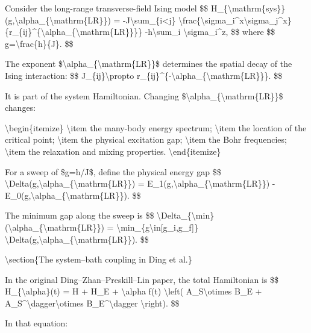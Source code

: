 {Consider the long-range transverse-field Ising model
\$\$
H\_\{\textbackslash{}mathrm\{sys\}\}(g,\textbackslash{}alpha\_\{\textbackslash{}mathrm\{LR\}\})
=
-J\textbackslash{}sum\_\{i<j\}
\textbackslash{}frac\{\textbackslash{}sigma\_i\textasciicircum{}x\textbackslash{}sigma\_j\textasciicircum{}x\}
\{r\_\{ij\}\textasciicircum{}\{\textbackslash{}alpha\_\{\textbackslash{}mathrm\{LR\}\}\}\}
-h\textbackslash{}sum\_i \textbackslash{}sigma\_i\textasciicircum{}z,
\$\$
where
\$\$
g=\textbackslash{}frac\{h\}\{J\}.
\$\$

The exponent \$\textbackslash{}alpha\_\{\textbackslash{}mathrm\{LR\}\}\$ determines the spatial decay of the
Ising interaction:
\$\$
J\_\{ij\}\textbackslash{}propto r\_\{ij\}\textasciicircum{}\{-\textbackslash{}alpha\_\{\textbackslash{}mathrm\{LR\}\}\}.
\$\$

It is part of the system Hamiltonian. Changing
\$\textbackslash{}alpha\_\{\textbackslash{}mathrm\{LR\}\}\$ changes:

\textbackslash{}begin\{itemize\}
    \textbackslash{}item the many-body energy spectrum;
    \textbackslash{}item the location of the critical point;
    \textbackslash{}item the physical excitation gap;
    \textbackslash{}item the Bohr frequencies;
    \textbackslash{}item the relaxation and mixing properties.
\textbackslash{}end\{itemize\}

For a sweep of \$g=h/J\$, define the physical energy gap
\$\$
\textbackslash{}Delta(g,\textbackslash{}alpha\_\{\textbackslash{}mathrm\{LR\}\})
=
E\_1(g,\textbackslash{}alpha\_\{\textbackslash{}mathrm\{LR\}\})
-
E\_0(g,\textbackslash{}alpha\_\{\textbackslash{}mathrm\{LR\}\}).
\$\$

The minimum gap along the sweep is
\$\$
\textbackslash{}Delta\_\{\textbackslash{}min\}(\textbackslash{}alpha\_\{\textbackslash{}mathrm\{LR\}\})
=
\textbackslash{}min\_\{g\textbackslash{}in[g\_i,g\_f]\}
\textbackslash{}Delta(g,\textbackslash{}alpha\_\{\textbackslash{}mathrm\{LR\}\}).
\$\$

\textbackslash{}section\{The system--bath coupling in Ding et al.\}

In the original Ding--Zhan--Preskill--Lin paper, the total Hamiltonian is
\$\$
H\_\{\textbackslash{}alpha\}(t)
=
H
+
H\_E
+
\textbackslash{}alpha f(t)
\textbackslash{}left(
A\_S\textbackslash{}otimes B\_E
+
A\_S\textasciicircum{}\textbackslash{}dagger\textbackslash{}otimes B\_E\textasciicircum{}\textbackslash{}dagger
\textbackslash{}right).
\$\$

In that equation:

}

